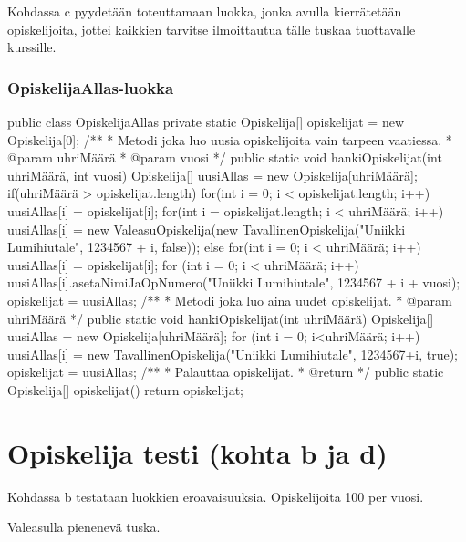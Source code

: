 \label{OpiskelijaAllas-luokka}

Kohdassa c pyydetään toteuttamaan luokka, jonka avulla kierrätetään opiskelijoita, jottei kaikkien tarvitse ilmoittautua tälle tuskaa tuottavalle kurssille.

\subsubsection{OpiskelijaAllas-luokka}
\label{OpiskelijaAllas-luokka}
\begin{javacode}
public class OpiskelijaAllas {
  private static Opiskelija[] opiskelijat = new Opiskelija[0];  
  /**
   * Metodi joka luo uusia opiskelijoita vain tarpeen vaatiessa.
   * @param uhriMäärä
   * @param vuosi
   */
  public static void hankiOpiskelijat(int uhriMäärä, int vuosi) {
    Opiskelija[] uusiAllas = new Opiskelija[uhriMäärä];
    if(uhriMäärä > opiskelijat.length) {
      for(int i = 0; i < opiskelijat.length; i++) {
        uusiAllas[i] = opiskelijat[i];
      }
      for(int i = opiskelijat.length; i < uhriMäärä; i++) {
        uusiAllas[i] = new ValeasuOpiskelija(new TavallinenOpiskelija("Uniikki Lumihiutale", 1234567 + i, false));
      }
    }
    else {
      for(int i = 0; i < uhriMäärä; i++) {
        uusiAllas[i] = opiskelijat[i];
      }
    }
    for (int i = 0; i < uhriMäärä; i++) {
      uusiAllas[i].asetaNimiJaOpNumero("Uniikki Lumihiutale", 1234567 + i + vuosi);
    }
    opiskelijat = uusiAllas;
  }  
  /**
   * Metodi joka luo aina uudet opiskelijat.
   * @param uhriMäärä
   */
  public static void hankiOpiskelijat(int uhriMäärä) {
    Opiskelija[] uusiAllas = new Opiskelija[uhriMäärä];
    for (int i = 0; i<uhriMäärä; i++)
    uusiAllas[i] = new TavallinenOpiskelija("Uniikki Lumihiutale", 1234567+i, true);
    opiskelijat = uusiAllas;
  }
  /**
   * Palauttaa opiskelijat.
   * @return
   */
  public static Opiskelija[] opiskelijat() {
    return opiskelijat;
  }  
}
\end{javacode}



\section{Opiskelija testi (kohta b ja d)}

\label{Opiskelija testi}

Kohdassa b testataan luokkien eroavaisuuksia. Opiskelijoita 100 per vuosi.

Valeasulla pienenevä tuska.

